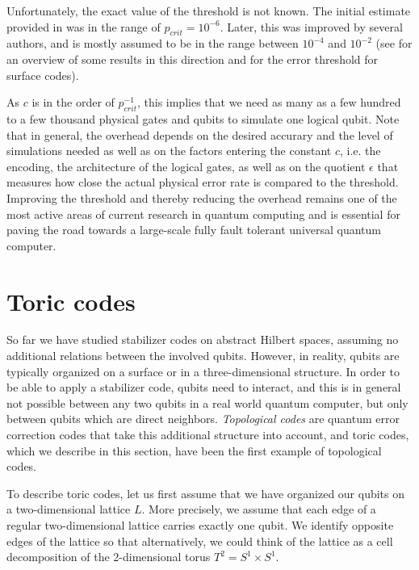 \documentclass[a4paper, draft]{article}
\theoremstyle{own}
\theoremstyle{remark}
\begin{document}
Unfortunately, the exact value of the threshold is not known. The initial estimate provided in \cite{AharonovOr} was in the range of $p_{crit} = 10^{-6}$. Later, this was improved by several authors, and is mostly assumed to be in the range between $10^{-4}$ and $10^{-2}$ (see \cite{Beginners} for an overview of some results in this direction and \cite{SurfaceCodes} for the error threshold for surface codes). 

As $c$ is in the order of $p_{crit}^{-1}$, this implies that we need as many as a few hundred to a few thousand physical gates and qubits to simulate one logical qubit. Note that in general, the overhead depends on the desired accurary and the level of simulations needed as well as on the factors entering the constant $c$, i.e. the encoding, the architecture of the logical gates, as well as on the quotient $\epsilon$ that measures how close the actual physical error rate is compared to the threshold. Improving the threshold and thereby reducing the overhead remains one of the most active areas of current research in quantum computing and is essential for paving the road towards a large-scale fully fault tolerant universal quantum computer.


\section{Toric codes}

So far we have studied stabilizer codes on abstract Hilbert spaces, assuming no additional relations between the involved qubits. However, in reality, qubits are typically organized on a surface or in a three-dimensional structure. In order to be able to apply a stabilizer code, qubits need to interact, and this is in general not possible between any two qubits in a real world quantum computer, but only between qubits which are direct neighbors. \emph{Topological codes} are quantum error correction codes that take this additional structure into account, and toric codes, which we describe in this section, have been the first example of topological codes.

To describe toric codes, let us first assume that we have organized our qubits on a two-dimensional lattice $L$. More precisely, we assume that each edge of a regular two-dimensional lattice carries exactly one qubit. We identify opposite edges of the lattice so that alternatively, we could think of the lattice as a cell decomposition of the 2-dimensional torus $T^2 = S^1 \times S^1$. 
\end{document}
